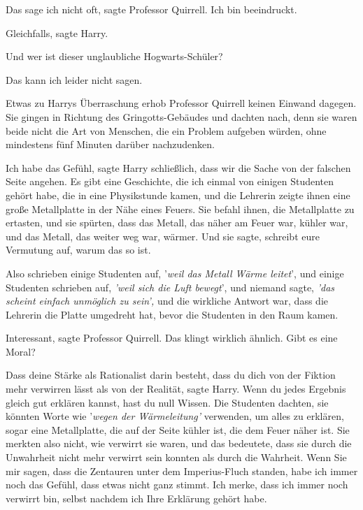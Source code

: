 \glqq{}Das sage ich nicht oft\grqq{}, sagte Professor Quirrell. \glqq{}Ich bin
beeindruckt.\grqq{}

\glqq{}Gleichfalls\grqq{}, sagte Harry.

\glqq{}Und wer ist dieser unglaubliche Hogwarts-Schüler?\grqq{}

\glqq{}Das kann ich leider nicht sagen.\grqq{}

Etwas zu Harrys Überraschung erhob Professor Quirrell keinen Einwand dagegen.
Sie gingen in Richtung des Gringotts-Gebäudes und dachten nach, denn sie waren
beide nicht die Art von Menschen, die ein Problem aufgeben würden, ohne
mindestens fünf Minuten darüber nachzudenken.

\glqq{}Ich habe das Gefühl\grqq{}, sagte Harry schließlich, \glqq{}dass wir die
Sache von der falschen Seite angehen. Es gibt eine Geschichte, die ich einmal
von einigen Studenten gehört habe, die in eine Physikstunde kamen, und die
Lehrerin zeigte ihnen eine große Metallplatte in der Nähe eines Feuers. Sie
befahl ihnen, die Metallplatte zu ertasten, und sie spürten, dass das Metall,
das näher am Feuer war, kühler war, und das Metall, das weiter weg war, wärmer.
Und sie sagte, schreibt eure Vermutung auf, warum das so ist.

Also schrieben einige Studenten auf, '\emph{weil das Metall Wärme leitet}', und
einige Studenten schrieben auf, \emph{'weil sich die Luft bewegt}', und niemand
sagte,\emph{ 'das scheint einfach unmöglich zu sein',} und die wirkliche Antwort
war, dass die Lehrerin die Platte umgedreht hat, bevor die Studenten in den Raum
kamen.\grqq{}

\glqq{}Interessant\grqq{}, sagte Professor Quirrell. \glqq{}Das klingt wirklich
ähnlich. Gibt es eine Moral?\grqq{}

\glqq{}Dass deine Stärke als Rationalist darin besteht, dass du dich von der
Fiktion mehr verwirren lässt als von der Realität\grqq{}, sagte Harry. \glqq{}
Wenn du jedes Ergebnis gleich gut erklären kannst, hast du null Wissen. Die
Studenten dachten, sie könnten Worte wie '\emph{wegen der Wärmeleitung'}
verwenden, um alles zu erklären, sogar eine Metallplatte, die auf der Seite
kühler ist, die dem Feuer näher ist. Sie merkten also nicht, wie verwirrt sie
waren, und das bedeutete, dass sie durch die Unwahrheit nicht mehr verwirrt sein
konnten als durch die Wahrheit. Wenn Sie mir sagen, dass die Zentauren unter dem
Imperius-Fluch standen, habe ich immer noch das Gefühl, dass etwas nicht ganz
stimmt. Ich merke, dass ich immer noch verwirrt bin, selbst nachdem ich Ihre
Erklärung gehört habe.\grqq{}

